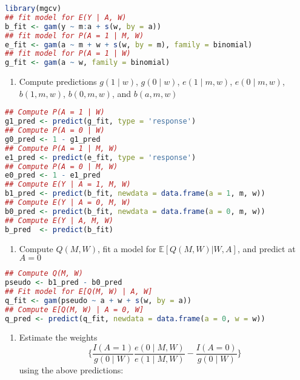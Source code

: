 \documentclass[
  12pt,
]{book}
\providecommand{\tightlist}{%
  \setlength{\itemsep}{0pt}\setlength{\parskip}{0pt}}
\theoremstyle{definition}
\theoremstyle{definition}
\theoremstyle{definition}
\newcommand{\E}{\mathbb{E}}
\newcommand{\1}{\mathbbm{1}}
\begin{document}
\begin{lstlisting}[language=R]
library(mgcv)
## fit model for E(Y | A, W)
b_fit <- gam(y ~ m:a + s(w, by = a))
## fit model for P(A = 1 | M, W)
e_fit <- gam(a ~ m + w + s(w, by = m), family = binomial)
## fit model for P(A = 1 | W)
g_fit <- gam(a ~ w, family = binomial)
\end{lstlisting}

\begin{enumerate}
\def\labelenumi{\arabic{enumi}.}
\setcounter{enumi}{1}
\tightlist
\item
  Compute predictions \(g(1\mid w)\), \(g(0\mid w)\), \(e(1\mid m, w)\),
  \(e(0\mid m, w)\),\(b(1, m, w)\), \(b(0, m, w)\), and \(b(a, m, w)\)
\end{enumerate}

\begin{lstlisting}[language=R]
## Compute P(A = 1 | W)
g1_pred <- predict(g_fit, type = 'response')
## Compute P(A = 0 | W)
g0_pred <- 1 - g1_pred
## Compute P(A = 1 | M, W)
e1_pred <- predict(e_fit, type = 'response')
## Compute P(A = 0 | M, W)
e0_pred <- 1 - e1_pred
## Compute E(Y | A = 1, M, W)
b1_pred <- predict(b_fit, newdata = data.frame(a = 1, m, w))
## Compute E(Y | A = 0, M, W)
b0_pred <- predict(b_fit, newdata = data.frame(a = 0, m, w))
## Compute E(Y | A, M, W)
b_pred  <- predict(b_fit)
\end{lstlisting}

\begin{enumerate}
\def\labelenumi{\arabic{enumi}.}
\setcounter{enumi}{2}
\tightlist
\item
  Compute \(Q(M, W)\), fit a model for \(\E[Q(M,W) | W,A]\), and predict at \(A=0\)
\end{enumerate}

\begin{lstlisting}[language=R]
## Compute Q(M, W)
pseudo <- b1_pred - b0_pred
## Fit model for E[Q(M, W) | A, W]
q_fit <- gam(pseudo ~ a + w + s(w, by = a))
## Compute E[Q(M, W) | A = 0, W]
q_pred <- predict(q_fit, newdata = data.frame(a = 0, w = w))
\end{lstlisting}

\begin{enumerate}
\def\labelenumi{\arabic{enumi}.}
\setcounter{enumi}{3}
\tightlist
\item
  Estimate the weights
  \begin{equation*}
    \bigg\{ \frac{I(A=1)}{g(0\mid W)}\frac{e(0\mid M,W)}{e(1\mid M,W)} -
     \frac{I(A=0)}{g(0\mid W)}\bigg\}
    \end{equation*}
  using the above predictions:
\end{enumerate}
\end{document}
